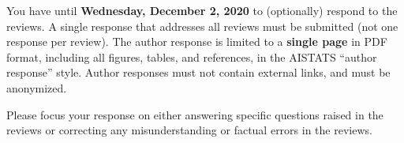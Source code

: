 \documentclass{article}
\begin{document}
You have until \textbf{Wednesday, December 2, 2020} to (optionally) respond to the reviews. A single response that addresses all reviews must be submitted (not one response per review). The author response is limited to a \textbf{single page} in PDF format, including all figures, tables, and references, in the AISTATS ``author response'' style. Author responses must not contain external links, and must be anonymized.

Please focus your response on either answering specific questions raised in the reviews or correcting any misunderstanding or factual errors in the reviews.
\end{document}
